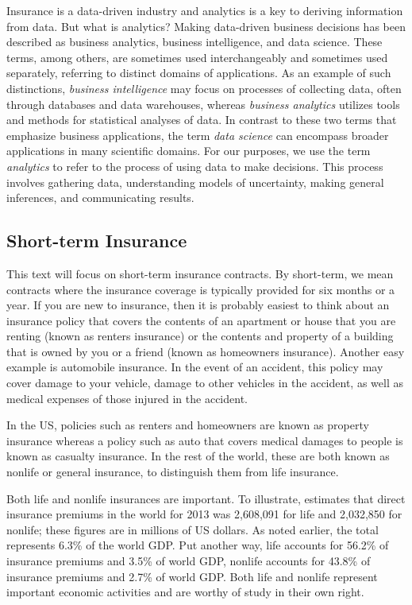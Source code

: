 \documentclass[]{book}
\theoremstyle{definition}
\theoremstyle{definition}
\theoremstyle{definition}
\theoremstyle{remark}
\begin{document}
Insurance is a data-driven industry and analytics is a key to deriving
information from data. But what is analytics? Making data-driven
business decisions has been described as business analytics, business
intelligence, and data science. These terms, among others, are sometimes
used interchangeably and sometimes used separately, referring to
distinct domains of applications. As an example of such distinctions,
\emph{business intelligence} may focus on processes of collecting data,
often through databases and data warehouses, whereas \emph{business
analytics} utilizes tools and methods for statistical analyses of data.
In contrast to these two terms that emphasize business applications, the
term \emph{data science} can encompass broader applications in many
scientific domains. For our purposes, we use the term \emph{analytics}
to refer to the process of using data to make decisions. This process
involves gathering data, understanding models of uncertainty, making
general inferences, and communicating results.

\subsection{Short-term Insurance}\label{short-term-insurance}

This text will focus on short-term insurance contracts. By short-term,
we mean contracts where the insurance coverage is typically provided for
six months or a year. If you are new to insurance, then it is probably
easiest to think about an insurance policy that covers the contents of
an apartment or house that you are renting (known as renters insurance)
or the contents and property of a building that is owned by you or a
friend (known as homeowners insurance). Another easy example is
automobile insurance. In the event of an accident, this policy may cover
damage to your vehicle, damage to other vehicles in the accident, as
well as medical expenses of those injured in the accident.

In the US, policies such as renters and homeowners are known as property
insurance whereas a policy such as auto that covers medical damages to
people is known as casualty insurance. In the rest of the world, these
are both known as nonlife or general insurance, to distinguish them from
life insurance.

Both life and nonlife insurances are important. To illustrate,
\citep{III2015} estimates that direct insurance premiums in the world
for 2013 was 2,608,091 for life and 2,032,850 for nonlife; these figures
are in millions of US dollars. As noted earlier, the total represents
6.3\% of the world GDP. Put another way, life accounts for 56.2\% of
insurance premiums and 3.5\% of world GDP, nonlife accounts for 43.8\%
of insurance premiums and 2.7\% of world GDP. Both life and nonlife
represent important economic activities and are worthy of study in their
own right.
\end{document}
